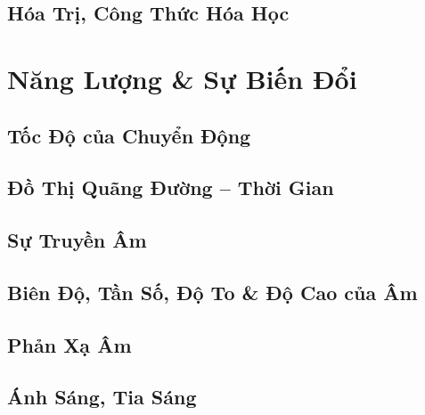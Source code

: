 \documentclass{article}
\numberwithin{equation}{section}
\begin{document}
\subsection{Hóa Trị, Công Thức Hóa Học}


\section{Năng Lượng \& Sự Biến Đổi}

\subsection{Tốc Độ của Chuyển Động}


\subsection{Đồ Thị Quãng Đường -- Thời Gian}


\subsection{Sự Truyền Âm}


\subsection{Biên Độ, Tần Số, Độ To \& Độ Cao của Âm}


\subsection{Phản Xạ Âm}


\subsection{Ánh Sáng, Tia Sáng}
\end{document}
